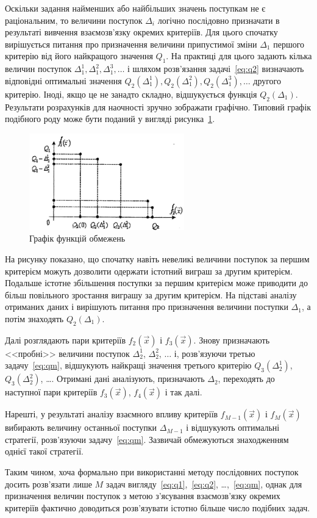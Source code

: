 Оскільки задання найменших або найбільших значень поступкам не є раціональним, то величини поступок $\Delta_i$ логічно послідовно призначати в результаті вивчення взаємозв'язку окремих критеріїв. 
Для цього спочатку вирішується питання про призначення величини припустимої зміни $\Delta_1$ першого критерію від його найкращого значення $Q_1$. 
На практиці для цього задають кілька величин поступок $\Delta_1^1, \Delta_1^2, \Delta_1^3, \dotsc$ і шляхом розв'язання задачі~\eqref{eq:q2} визначають відповідні оптимальні значення $Q_2(\Delta_1^1), Q_2(\Delta_1^2), Q_2(\Delta_1^3), \dotsc$ другого критерію. 
Іноді, якщо це не занадто складно, відшукується функція $Q_2(\Delta_1)$. 
Результати розрахунків для наочності зручно зображати графічно. 
Типовий графік подібного роду може бути поданий у вигляді рисунка~\ref{fig:example_q2}.

\begin{figure}[H]
  \centering
    \includegraphics[width=0.6\textwidth]{figures/example_q2}
  \caption{Графік функцій обмежень}
  \label{fig:example_q2}
\end{figure}

На рисунку показано, що спочатку навіть невеликі величини поступок за першим критерієм можуть дозволити одержати істотний виграш за другим критерієм.
Подальше істотне збільшення поступки за першим критерієм може приводити до більш повільного зростання виграшу за другим критерієм.
На підставі аналізу отриманих даних і вирішують питання про призначення величини поступки $\Delta_1$, а потім знаходять $Q_2(\Delta_1)$.

Далі розглядають пари критеріїв $f_2(\vec{x})$ і $f_3(\vec{x})$. 
Знову призначають <<пробні>> величини поступок $\Delta_2^1$, $\Delta_2^2$, $\dots$ і, розв'язуючи третью задачу~\eqref{eq:qm}, відшукують найкращі значення третього критерію $Q_3(\Delta_2^1)$, $Q_3(\Delta_2^2)$, \dots. 
Отримані дані аналізують, призначають $\Delta_2$, переходять до наступної пари критеріїв $f_3(\vec{x})$, $f_4(\vec{x})$ і так далі.

Нарешті, у результаті аналізу взаємного впливу критеріїв $f_{M-1}(\vec{x})$ і $f_{M}(\vec{x})$ вибирають величину останньої поступки $\Delta_{M-1}$ і відшукують оптимальні стратегії, розв'язуючи задачу~\eqref{eq:qm}. 
Зазвичай обмежуються знаходженням однієї такої стратегії.

Таким чином, хоча формально при використанні методу послідовних поступок досить розв'язати лише $M$ задач вигляду~\eqref{eq:q1},~\eqref{eq:q2}, \dots ,~\eqref{eq:qm}, однак для призначення величин поступок з метою з'ясування взаємозв'язку окремих критеріїв фактично доводиться розв'язувати істотно більше число подібних задач.

